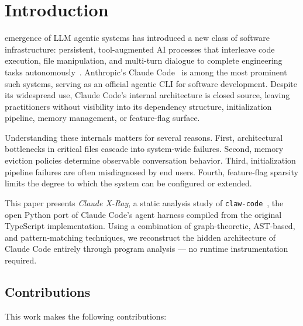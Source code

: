 \documentclass[conference]{IEEEtran}
\begin{document}
\section{Introduction}

 emergence of LLM agentic systems has introduced
a new class of software infrastructure: persistent, tool-augmented AI
processes that interleave code execution, file manipulation, and
multi-turn dialogue to complete engineering tasks
autonomously~\cite{yao2022react,shinn2023reflexion}. Anthropic's
Claude Code~\cite{anthropic2024claudecode} is among the most prominent
such systems, serving as an official agentic CLI for software
development. Despite its widespread use, Claude Code's internal
architecture is closed source, leaving practitioners without visibility
into its dependency structure, initialization pipeline, memory
management, or feature-flag surface.

Understanding these internals matters for several reasons. First,
architectural bottlenecks in critical files cascade into system-wide
failures. Second, memory eviction policies determine observable
conversation behavior. Third, initialization pipeline failures are
often misdiagnosed by end users. Fourth, feature-flag sparsity limits
the degree to which the system can be configured or extended.

This paper presents \emph{Claude X-Ray}, a static analysis study of
\texttt{claw-code}~\cite{instructkr2024clawcode}, the open Python port
of Claude Code's agent harness compiled from the original TypeScript
implementation. Using a combination of graph-theoretic, AST-based, and
pattern-matching techniques, we reconstruct the hidden architecture of
Claude Code entirely through program analysis --- no runtime
instrumentation required.

\subsection{Contributions}

This work makes the following contributions:
\end{document}
